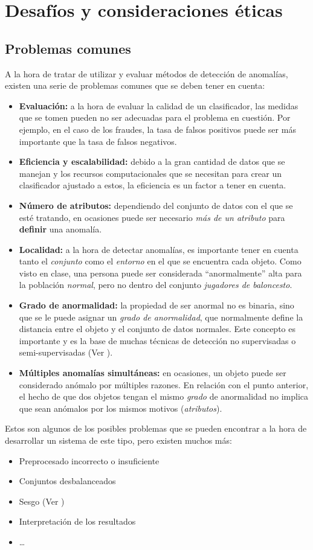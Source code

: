 \chapter{Desafíos y consideraciones éticas}
\section{Problemas comunes}\label{sec:issues}
A la hora de tratar de utilizar y evaluar métodos de detección de anomalías, existen una
serie de problemas comunes que se deben tener en cuenta:

\begin{itemize}[topsep=0pt]
	\item \textbf{Evaluación:} a la hora de evaluar la calidad de un clasificador, las medidas que se tomen
		pueden no ser adecuadas para el problema en cuestión. Por ejemplo, en el caso de los fraudes,
		la tasa de falsos positivos puede ser más importante que la tasa de falsos negativos.
	\item \textbf{Eficiencia y escalabilidad:} debido a la gran cantidad de datos que se manejan y los
		recursos computacionales que se necesitan para crear un clasificador ajustado a estos, la eficiencia
		es un factor a tener en cuenta.
	\item \textbf{Número de atributos:} dependiendo del conjunto de datos con el que se esté tratando, en
		ocasiones puede ser necesario \emph{más de un atributo} para \textbf{definir} una anomalía.
	\item \textbf{Localidad:} a la hora de detectar anomalías, es importante tener en cuenta tanto el
		\emph{conjunto} como el \emph{entorno} en el que se encuentra cada objeto. Como visto en clase,
		una persona puede ser considerada ``anormalmente'' alta para la población \textit{normal},
		pero no dentro del conjunto \textit{jugadores de baloncesto}.
	\item \textbf{Grado de anormalidad:} la propiedad de ser anormal no es binaria, sino que se le puede
		asignar un \emph{grado de anormalidad}, que normalmente define la distancia entre el objeto y el
		conjunto de datos normales. Este concepto es importante y es la base de muchas técnicas de detección
		no supervisadas o semi-supervisadas (Ver ).
	\item \textbf{Múltiples anomalías simultáneas:} en ocasiones, un objeto puede ser considerado anómalo
		por múltiples razones. En relación con el punto anterior, el hecho de que dos objetos tengan el mismo
		\textit{grado} de anormalidad no implica que sean anómalos por los mismos motivos (\textit{atributos}).
\end{itemize}
\newpage{}
Estos son algunos de los posibles problemas que se pueden encontrar a la hora de desarrollar un sistema de
este tipo, pero existen muchos más:
\begin{itemize}
	\item Preprocesado incorrecto o insuficiente
	\item Conjuntos desbalanceados
	\item Sesgo (Ver )
	\item Interpretación de los resultados
	\item \ldots
\end{itemize}

